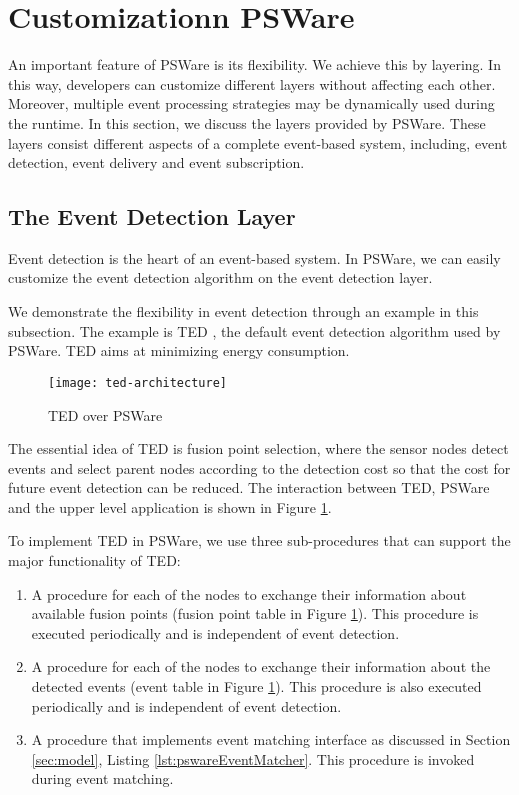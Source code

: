 \section{Customizationn PSWare}
\label{sec:flexibility}
An important feature of PSWare is its flexibility. We achieve this by layering. In this way, developers can customize different layers without affecting each other. Moreover, multiple event processing strategies may be dynamically used during the runtime. In this section, we discuss the layers provided by PSWare. These layers consist different aspects of a complete event-based system, including, event detection, event delivery and event subscription.

\subsection{The Event Detection Layer}
Event detection is the heart of an event-based system. In PSWare, we can easily customize the event detection algorithm on the event detection layer.

We demonstrate the flexibility in event detection through an example in this subsection. The example is TED \cite{lai:ted}, the default event detection algorithm used by PSWare. TED aims at minimizing energy consumption. %

\begin{figure}
\centering
\texttt{[image: ted-architecture]}
\caption{TED over PSWare}
\label{fig:ted-architecture}
\end{figure}

The essential idea of TED is fusion point selection, where the sensor nodes detect events and select parent nodes according to the detection cost so that the cost for future event detection can be reduced. The interaction between TED, PSWare and the upper level application is shown in Figure \ref{fig:ted-architecture}.

To implement TED in PSWare, we use three sub-procedures that can support the major functionality of TED:
\begin{enumerate}
\item A procedure for each of the nodes to exchange their information about available fusion points (fusion point table in Figure \ref{fig:ted-architecture}). This procedure is executed periodically and is independent of event detection.
\item A procedure for each of the nodes to exchange their information about the detected events (event table in Figure \ref{fig:ted-architecture}). This procedure is also executed periodically and is independent of event detection.
\item A procedure that implements event matching interface as discussed in Section \ref{sec:model}, Listing \ref{lst:pswareEventMatcher}. This procedure is invoked during event matching.
\end{enumerate}

